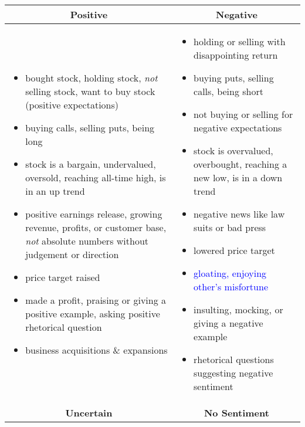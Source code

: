 
\begin{table}[!ht]
\centering
\small
\begin{tabular}{p{7.5cm}p{7.5cm}}
\toprule
\multicolumn{1}{c}{\textbf{Positive}} & \multicolumn{1}{c}{\textbf{Negative}} \\
\midrule

\begin{itemize}[noitemsep,leftmargin=*,topsep=-12pt]
	\item bought stock, holding stock, \emph{not} selling stock, want to buy stock (positive expectations)
	\item buying calls, selling puts, being long
	\item stock is a bargain, undervalued, oversold, reaching all-time high, is in an up trend
	\item positive earnings release, growing revenue, profits, or customer base, \emph{not} absolute numbers without judgement or direction
	\item price target raised
	\item made a profit, praising or giving a positive example, asking positive rhetorical question
	\item business acquisitions \& expansions

\end{itemize} & \begin{itemize}[noitemsep,leftmargin=*,topsep=-12pt]
	\item holding or selling with disappointing return
	\item buying puts, selling calls, being short
	\item not buying or selling for negative expectations
 	\item stock is overvalued, overbought, reaching a new low, is in a down trend
 	\item negative news like law suits or bad press
 	\item lowered price target
 	\item \textcolor{blue}{gloating, enjoying other's misfortune}
 	\item insulting, mocking, or giving a negative example
 	\item rhetorical questions suggesting negative sentiment 

\end{itemize}\\
\toprule
\multicolumn{1}{c}{\textbf{Uncertain}} & \multicolumn{1}{c}{\textbf{No Sentiment}} \\
\midrule


\end{tabular}
\end{table}
